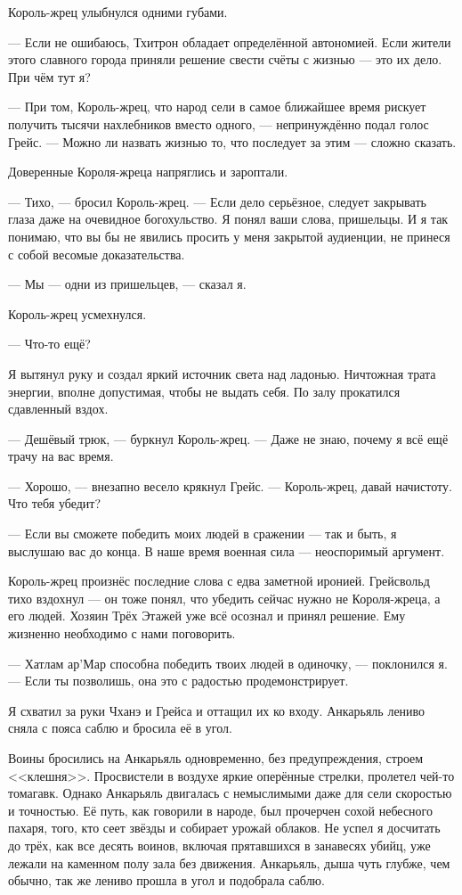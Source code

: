 Король-жрец улыбнулся одними губами.

--- Если не ошибаюсь, Тхитрон обладает определённой автономией.
Если жители этого славного города приняли решение свести счёты с жизнью --- это их дело.
При чём тут я?

--- При том, Король-жрец, что народ сели в самое ближайшее время рискует получить тысячи нахлебников вместо одного, --- непринуждённо подал голос Грейс.
--- Можно ли назвать жизнью то, что последует за этим --- сложно сказать.

Доверенные Короля-жреца напряглись и зароптали.

--- Тихо, --- бросил Король-жрец.
--- Если дело серьёзное, следует закрывать глаза даже на очевидное богохульство.
Я понял ваши слова, пришельцы.
И я так понимаю, что вы бы не явились просить у меня закрытой аудиенции, не принеся с собой весомые доказательства.

--- Мы --- одни из пришельцев, --- сказал я.

Король-жрец усмехнулся.

--- Что-то ещё?

Я вытянул руку и создал яркий источник света над ладонью.
Ничтожная трата энергии, вполне допустимая, чтобы не выдать себя.
По залу прокатился сдавленный вздох.

--- Дешёвый трюк, --- буркнул Король-жрец.
--- Даже не знаю, почему я всё ещё трачу на вас время.

--- Хорошо, --- внезапно весело крякнул Грейс.
--- Король-жрец, давай начистоту.
Что тебя убедит?

--- Если вы сможете победить моих людей в сражении --- так и быть, я выслушаю вас до конца.
В наше время военная сила --- неоспоримый аргумент.

Король-жрец произнёс последние слова с едва заметной иронией.
Грейсвольд тихо вздохнул --- он тоже понял, что убедить сейчас нужно не Короля-жреца, а его людей.
Хозяин Трёх Этажей уже всё осознал и принял решение.
Ему жизненно необходимо с нами поговорить.

--- Хатлам ар’Мар способна победить твоих людей в одиночку, --- поклонился я.
--- Если ты позволишь, она это с радостью продемонстрирует.

Я схватил за руки Чханэ и Грейса и оттащил их ко входу.
Анкарьяль лениво сняла с пояса саблю и бросила её в угол.

Воины бросились на Анкарьяль одновременно, без предупреждения, строем <<клешня>>.
Просвистели в воздухе яркие оперённые стрелки, пролетел чей-то томагавк.
Однако Анкарьяль двигалась с немыслимыми даже для сели скоростью и точностью.
Её путь, как говорили в народе, был прочерчен сохой небесного пахаря, того, кто сеет звёзды и собирает урожай облаков\FM.
Не успел я досчитать до трёх, как все десять воинов, включая прятавшихся в занавесях убийц, уже лежали на каменном полу зала без движения.
Анкарьяль, дыша чуть глубже, чем обычно, так же лениво прошла в угол и подобрала саблю.

